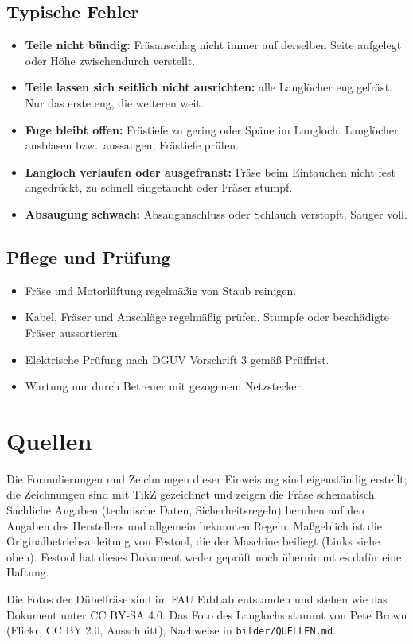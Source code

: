 \documentclass{\basedir/fablab-document}
\begin{document}
	\subsection{Typische Fehler}
	\begin{itemize}
		\item \textbf{Teile nicht bündig:} Fräsanschlag nicht immer auf derselben Seite aufgelegt oder Höhe zwischendurch verstellt.
		\item \textbf{Teile lassen sich seitlich nicht ausrichten:} alle Langlöcher eng gefräst. Nur das erste eng, die weiteren weit.
		\item \textbf{Fuge bleibt offen:} Frästiefe zu gering oder Späne im Langloch. Langlöcher ausblasen bzw.\ aussaugen, Frästiefe prüfen.
		\item \textbf{Langloch verlaufen oder ausgefranst:} Fräse beim Eintauchen nicht fest angedrückt, zu schnell eingetaucht oder Fräser stumpf.
		\item \textbf{Absaugung schwach:} Absauganschluss oder Schlauch verstopft, Sauger voll.
	\end{itemize}

	\subsection{Pflege und Prüfung}
	\begin{itemize}
		\item Fräse und Motorlüftung regelmäßig von Staub reinigen.
		\item Kabel, Fräser und Anschläge regelmäßig prüfen. Stumpfe oder beschädigte Fräser aussortieren.
		\item Elektrische Prüfung nach DGUV Vorschrift 3 gemäß Prüffrist.
		\item Wartung nur durch Betreuer mit gezogenem Netzstecker.
	\end{itemize}

	\section{Quellen}
	Die Formulierungen und Zeichnungen dieser Einweisung sind eigenständig erstellt; die Zeichnungen sind mit TikZ gezeichnet und zeigen die Fräse schematisch. Sachliche Angaben (technische Daten, Sicherheitsregeln) beruhen auf den Angaben des Herstellers und allgemein bekannten Regeln. Maßgeblich ist die Originalbetriebsanleitung von Festool, die der Maschine beiliegt (Links siehe oben). Festool hat dieses Dokument weder geprüft noch übernimmt es dafür eine Haftung.

	Die Fotos der Dübelfräse sind im FAU FabLab entstanden und stehen wie das Dokument unter CC BY-SA 4.0. Das Foto des Langlochs stammt von Pete Brown (Flickr, CC BY 2.0, Ausschnitt); Nachweise in \texttt{bilder/QUELLEN.md}.

\end{document}
